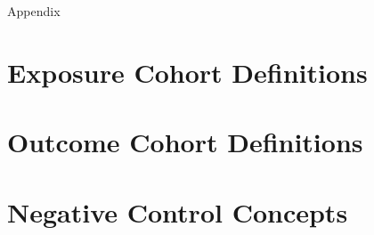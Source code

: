 \documentclass[
  12pt,
]{article}
\begin{document}
\clearpage

\centerline{\Huge Appendix}

\hypertarget{appendix-appendix}{%
\appendix}


\hypertarget{exposure-cohort-definitions}{%
\section{Exposure Cohort Definitions}\label{exposure-cohort-definitions}}

\hypertarget{outcome-cohort-definitions}{%
\section{Outcome Cohort Definitions}\label{outcome-cohort-definitions}}

\hypertarget{negative-controls}{%
\section{Negative Control Concepts}\label{negative-controls}}
\end{document}
